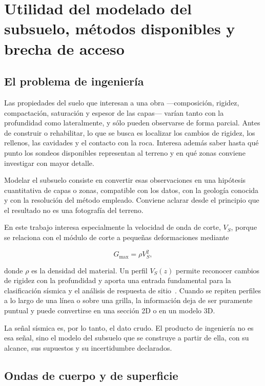 \section{Utilidad del modelado del subsuelo, métodos disponibles y brecha de acceso}
\label{sec:problema-modelado}

\subsection{El problema de ingeniería}

Las propiedades del suelo que interesan a una obra ---composición, rigidez,
compactación, saturación y espesor de las capas--- varían tanto con la profundidad como
lateralmente, y sólo pueden observarse de forma parcial. Antes de construir o rehabilitar,
lo que se busca es localizar los cambios de rigidez, los rellenos, las cavidades y el
contacto con la roca. Interesa además saber hasta qué punto los sondeos disponibles
representan al terreno y en qué zonas conviene investigar con mayor detalle.

Modelar el subsuelo consiste en convertir esas observaciones en una hipótesis
cuantitativa de capas o zonas, compatible con los datos, con la geología conocida y con
la resolución del método empleado. Conviene aclarar desde el principio que el resultado
no es una fotografía del terreno.

En este trabajo interesa especialmente la velocidad de onda de corte, $V_S$, porque se
relaciona con el módulo de corte a pequeñas deformaciones mediante

\begin{equation}
    G_{\max}=\rho V_S^2,
\end{equation}

donde $\rho$ es la densidad del material. Un perfil $V_S(z)$ permite reconocer cambios
de rigidez con la profundidad y aporta una entrada fundamental para la clasificación
sísmica y el análisis de respuesta de sitio~\cite{Kramer1996,Foti2014}. Cuando se
repiten perfiles a lo largo de una línea o sobre una grilla, la información deja de ser
puramente puntual y puede convertirse en una sección 2D o en un modelo 3D.

La señal sísmica es, por lo tanto, el dato crudo. El producto de ingeniería no es esa
señal, sino el modelo del subsuelo que se construye a partir de ella, con su alcance,
sus supuestos y su incertidumbre declarados.

\subsection{Ondas de cuerpo y de superficie}

